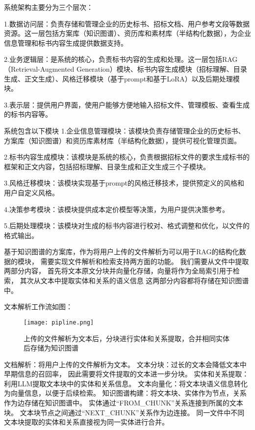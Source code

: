 \documentclass{xmu}
\begin{document}


系统架构主要分为三个层次：

1.数据访问层：负责存储和管理企业的历史标书、招标文档、用户参考文段等数据资源。这一层包括方案库（知识图谱）、资历库和素材库（半结构化数据），为企业信息管理和标书内容生成提供数据支持。

2.业务逻辑层：是系统的核心，负责标书内容的生成和处理。这一层包括RAG（Retrieval-Augmented Generation）模块、标书内容生成模块（招标理解、目录生成、正文生成）、风格迁移模块（基于prompt和基于LoRA）以及后期处理模块。

3.表示层：提供用户界面，使用户能够方便地输入招标文件、管理模板、查看生成的标书内容等。

系统包含以下模块
1.企业信息管理模块：该模块负责存储管理企业的历史标书、方案库（知识图谱）和资历库素材库（半结构化数据），提供可视化管理页面。

2.标书内容生成模块：该模块是系统的核心，负责根据招标文件的要求生成标书的框架和正文内容，包括招标理解、目录生成和正文生成三个子模块。

3.风格迁移模块：该模块实现基于prompt的风格迁移技术，提供预定义的风格和用户自定义风格。

4.决策参考模块：该模块提供成本定价模型等决策，为用户提供决策参考。

5.后期处理模块：该模块对生成的标书内容进行校对、格式调整和优化，以文件的格式输出。


基于知识图谱的方案库，作为将用户上传的文件解析为可以用于RAG的结构化数据的模块，
需要实现文件解析和检索支持两方面的功能。
我们需要从文件中提取两部分内容，
首先将文本原文分块并向量化存储，向量将作为全局索引用于检索，
其次从文本中提取实体和关系的语义信息
这两部分内容都将存储在知识图谱中。

文本解析工作流如图：

\begin{figure}[!htb]
    \centering
    \texttt{[image: pipline.png]}\\
    \caption{上传的文件解析为文本后，分块进行实体和关系提取，合并相同实体后存储为知识图谱}\label{wenbwenjiexi}
\end{figure}

文档解析：将用户上传的文件解析为文本。
文本分块：过长的文本会降低文本中早期信息的召回率\cite{Long}，
因此需要将文件提取的文本进一步分块。
实体和关系提取：利用LLM提取文本块中的实体和关系信息。
文本向量化：将文本块语义信息转化为向量信息，以便于后续检索。
知识图谱构建：将文本块、实体作为节点，关系作为边存储在知识图谱中。
实体通过“FROM\_CHUNK”关系连接到所属的文本块。
文本块节点之间通过“NEXT\_CHUNK”关系作为边连接。
同一文件中不同文本块提取的实体和关系直接视为同一实体进行合并。
\end{document}
